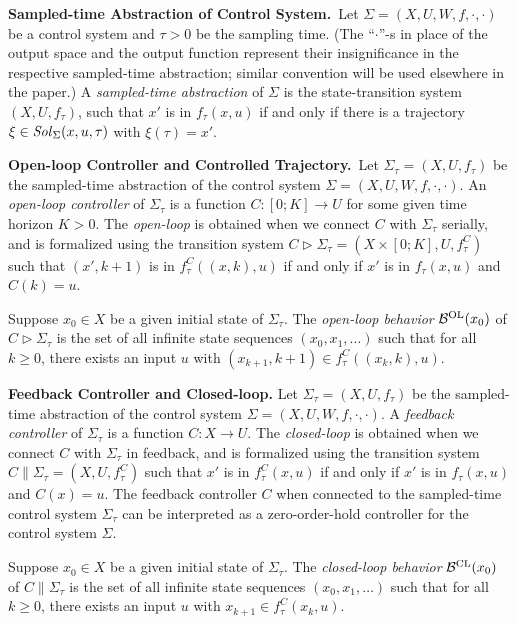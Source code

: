 \smallskip
\noindent\textbf{Sampled-time Abstraction of Control System.}\
Let $\Sigma = (X, U, W, f, \cdot, \cdot)$ be a control system and $\tau>0$ be the sampling time.
(The ``$\cdot$''-s in place of the output space and the output function represent their insignificance in the respective sampled-time abstraction; similar convention will be used elsewhere in the paper.)
A \emph{sampled-time abstraction} of $\Sigma$ is the state-transition system $(X,U,f_\tau)$, such that $x'$ is in $f_\tau(x,u)$ if and only if there is a trajectory $\xi\in \mathit{Sol}_\Sigma(x,u,\tau)$ with $\xi(\tau)=x'$.

\smallskip
\noindent\textbf{Open-loop Controller and Controlled Trajectory.}\
Let $\Sigma_\tau=(X,U,f_\tau)$ be the sampled-time abstraction of the control system $\Sigma=(X,U,W,f,\cdot,\cdot)$.
An \emph{open-loop controller} of $\Sigma_\tau$ is a function $C\colon [0;K]\to U$ for some given time horizon $K>0$.
The \emph{open-loop} is obtained when we connect $C$ with $\Sigma_\tau$ serially, and is formalized using the transition system $C \triangleright \Sigma_\tau = (X\times [0;K],U,f_\tau^C)$ such that $(x',k+1)$ is in $f_\tau^C((x,k),u)$ if and only if $x'$ is in $f_\tau(x,u)$ and $C(k)=u$.

Suppose $x_0\in X$ be a given initial state of $\Sigma_\tau$.
The \emph{open-loop behavior} $\mathcal{B}^{\mathrm{OL}}(x_0)$ of $C \triangleright\Sigma_\tau$ is the set of all infinite state sequences $(x_0,x_1,\ldots)$ such that for all $k\geq 0$, there exists an input $u$ with $(x_{k+1},k+1)\in f_\tau^C((x_k,k),u)$.

\smallskip
\noindent\textbf{Feedback Controller and Closed-loop.}
Let $\Sigma_\tau=(X,U,f_\tau)$ be the sampled-time abstraction of the control system $\Sigma=(X,U,W,f,\cdot,\cdot)$.
A \emph{feedback controller} of $\Sigma_\tau$ is a function $C\colon X\to U$.
The \emph{closed-loop} is obtained when we connect $C$ with $\Sigma_\tau$ in feedback, and is formalized using the transition system $C\parallel\Sigma_\tau = (X,U,f_\tau^C)$ such that $x'$ is in $f_\tau^C(x,u)$ if and only if $x'$ is in $f_\tau(x,u)$ and $C(x)=u$.
The feedback controller $C$ when connected to the sampled-time control system $\Sigma_\tau$ can be interpreted as a zero-order-hold controller for the control system $\Sigma$.

Suppose $x_0\in X$ be a given initial state of $\Sigma_\tau$.
The \emph{closed-loop behavior} $\mathcal{B}^{\mathrm{CL}}(x_0)$ of $C\parallel\Sigma_\tau$ is the set of all infinite state sequences $(x_0,x_1,\ldots)$ such that for all $k\geq 0$, there exists an input $u$ with $x_{k+1}\in f_\tau^C(x_k,u)$.


